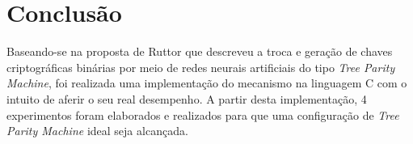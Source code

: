 \documentclass[12pt]{article}
\begin{document}
                

                
  
    \section{Conclusão}
    \label{sec:conclusao}
    


        
        Baseando-se na proposta de Ruttor \cite{ruttor2007neural} que descreveu a troca e geração de chaves criptográficas binárias por meio de redes neurais artificiais do tipo \textit{Tree Parity Machine}, foi realizada uma implementação do mecanismo na linguagem C com o intuito de aferir o seu real desempenho. A partir desta implementação, 4 experimentos foram elaborados e realizados para que uma configuração de \textit{Tree Parity Machine} ideal seja alcançada.
        
\end{document}

